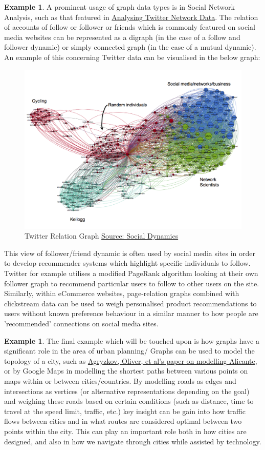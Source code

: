 \documentclass[11pt,reqno]{amsart}
\theoremstyle{definition}
\newtheorem{example}[thm]{Example}
\numberwithin{equation}{section}
\begin{document}
\begin{example}
	A prominent usage of graph data types is in Social Network Analysis, such as that featured in \href{http://social-dynamics.org/twitter-network-data/}{Analysing Twitter Network Data}. The relation of accounts of follow or follower or friends which is commonly featured on social media websites can be represented as a digraph (in the case of a follow and follower dynamic) or simply connected graph (in the case of a mutual dynamic). An example of this concerning Twitter data can be visualised in the below graph:
	
	\begin{figure}[h!]
		\centering
		\includegraphics[width=0.5\linewidth]{pjlambersonTwitter10_16_12}
		\caption{Twitter Relation Graph \href{http://social-dynamics.org/twitter-network-data/}{Source: Social Dynamics}}
		\label{fig:TwitterGraph}
	\end{figure}
\noindent This view of follower/friend dynamic is often used by social media sites in order to develop recommender systems which highlight specific individuals to follow. Twitter for example utilises a modified PageRank algorithm looking at their own follower graph to recommend particular users to follow to other users on the site. Similarly, within eCommerce websites, page-relation graphs combined with clickstream data can be used to weigh personalised product recommendations to users without known preference behaviour in a similar manner to how people are 'recommended' connections on social media sites.
\end{example}

\begin{example}
	The final example which will be touched upon is how graphs have a significant role in the area of urban planning/ Graphs can be used to model the topology of a city, such as \href{https://core.ac.uk/download/pdf/132348208.pdf}{Agryzkov, Oliver, et al's paper on modelling Alicante}, or by Google Maps in modelling the shortest paths between various points on maps within or between cities/countries. By modelling roads as edges and intersections as vertices (or alternative representations depending on the goal) and weighing these roads based on certain conditions (such as distance, time to travel at the speed limit, traffic, etc.) key insight can be gain into how traffic flows between cities and in what routes are considered optimal between two points within the city. This can play an important role both in how cities are designed, and also in how we navigate through cities while assisted by technology.
\end{example}
\end{document}
